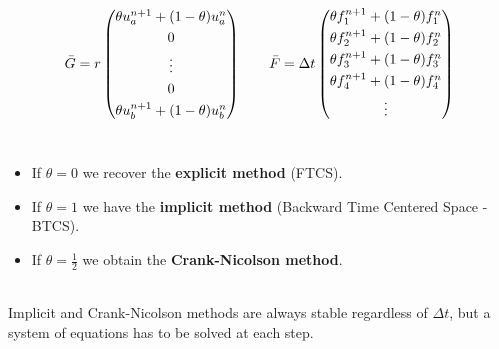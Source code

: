 \[
  \Bar{G} = r\begin{pmatrix}
    \theta u_a^{n+1} + (1-\theta)u_a^n\\[3pt]
    0\\[3pt]
    \vdots\\[3pt]
    0\\[3pt]
    \theta u_b^{n+1} + (1-\theta)u_b^n
  \end{pmatrix} \qquad \Bar{F}=\Delta t\begin{pmatrix}
    \theta f_1^{n+1} + (1-\theta)f_1^n\\[3pt]
    \theta f_2^{n+1} + (1-\theta)f_2^n\\[3pt]
    \theta f_3^{n+1} + (1-\theta)f_3^n\\[3pt]
    \theta f_4^{n+1} + (1-\theta)f_4^n\\[3pt]
    \vdots
  \end{pmatrix}
\]
\-\\
\begin{remark}\-
  \begin{itemize}
      \item If $\theta = 0$ we recover the \textbf{explicit method} (FTCS).
      \item If $\theta = 1$ we have the \textbf{implicit method} (Backward Time Centered Space - BTCS).
      \item If $\theta = \frac{1}{2}$ we obtain the \textbf{Crank-Nicolson method}.
  \end{itemize}
  \-\\
  Implicit and Crank-Nicolson methods are always stable regardless of $\Delta t$, but a system of equations has to be solved at each step.
\end{remark}

\begin{definition}
  
\end{definition}